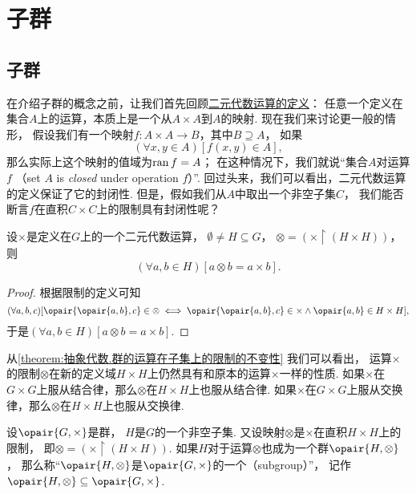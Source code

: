 \section{子群}
\subsection{子群}
在介绍子群的概念之前，让我们首先回顾\hyperref[definition:集合论.二元代数运算]{二元代数运算的定义}：
任意一个定义在集合\(A\)上的运算，本质上是一个从\(A \times A\)到\(A\)的映射.
现在我们来讨论更一般的情形，
假设我们有一个映射\(f\colon A \times A \to B\)，其中\(B \supseteq A\)，
如果\[
	(\forall x,y \in A)[f(x,y) \in A],
\]
那么实际上这个映射的值域为\(\operatorname{ran} f = A\)；
在这种情况下，我们就说“集合\(A\)对运算\(f\) %
（set \(A\) is \emph{closed} under operation \(f\)）”.
回过头来，我们可以看出，二元代数运算的定义保证了它的封闭性.
但是，假如我们从\(A\)中取出一个非空子集\(C\)，
我们能否断言\(f\)在直积\(C \times C\)上的限制具有封闭性呢？

\begin{lemma}\label{theorem:抽象代数.群的运算在子集上的限制的不变性}
设\(\times\)是定义在\(G\)上的一个二元代数运算，
\(\emptyset \neq H \subseteq G\)，
\(\otimes = (\times \upharpoonright(H \times H))\)，
则\[
	(\forall a,b \in H)[a \otimes b = a \times b].
\]
\begin{proof}
根据限制的定义可知\[
	(\forall a,b,c)[
		\opair{\opair{a,b},c} \in \otimes
		\iff
		\opair{\opair{a,b},c} \in \times
		\land
		\opair{a,b} \in H \times H
	],
\]
于是\((\forall a,b \in H)[a \otimes b = a \times b]\).
\end{proof}
\end{lemma}
从\cref{theorem:抽象代数.群的运算在子集上的限制的不变性} 我们可以看出，
运算\(\times\)的限制\(\otimes\)在新的定义域\(H \times H\)上仍然具有和原本的运算\(\times\)一样的性质.
如果\(\times\)在\(G \times G\)上服从结合律，那么\(\otimes\)在\(H \times H\)上也服从结合律.
如果\(\times\)在\(G \times G\)上服从交换律，那么\(\otimes\)在\(H \times H\)上也服从交换律.

\begin{definition}\label{definition:抽象代数.子群的定义}
设\(\opair{G,\times}\)是群，
\(H\)是\(G\)的一个非空子集.
又设映射\(\otimes\)是\(\times\)在直积\(H \times H\)上的限制，
即\(\otimes = (\times \upharpoonright(H \times H))\).
如果\(H\)对于运算\(\otimes\)也成为一个群\(\opair{H,\otimes}\)，
那么称“\(\opair{H,\otimes}\)是\(\opair{G,\times}\)的一个（subgroup）”，
记作\(\opair{H,\otimes} \subseteq \opair{G,\times}\).
\end{definition}

